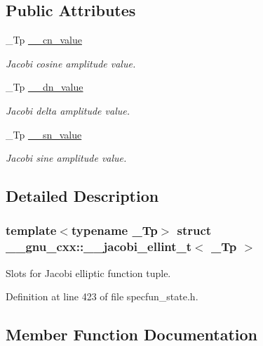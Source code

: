 \subsection*{Public Attributes}
\begin{DoxyCompactItemize}
\item 
\+\_\+\+Tp \hyperlink{struct____gnu__cxx_1_1____jacobi__ellint__t_a2ea9630244e97bfe0e182dbb5682ee30}{\+\_\+\+\_\+cn\+\_\+value}
\begin{DoxyCompactList}\small\item\em Jacobi cosine amplitude value. \end{DoxyCompactList}\item 
\+\_\+\+Tp \hyperlink{struct____gnu__cxx_1_1____jacobi__ellint__t_a08d15b208e574536f8c6113fc7d0c9a9}{\+\_\+\+\_\+dn\+\_\+value}
\begin{DoxyCompactList}\small\item\em Jacobi delta amplitude value. \end{DoxyCompactList}\item 
\+\_\+\+Tp \hyperlink{struct____gnu__cxx_1_1____jacobi__ellint__t_a011eb5bb9a1a6d845a26f17b485cf3d4}{\+\_\+\+\_\+sn\+\_\+value}
\begin{DoxyCompactList}\small\item\em Jacobi sine amplitude value. \end{DoxyCompactList}\end{DoxyCompactItemize}


\subsection{Detailed Description}
\subsubsection*{template$<$typename \+\_\+\+Tp$>$\newline
struct \+\_\+\+\_\+gnu\+\_\+cxx\+::\+\_\+\+\_\+jacobi\+\_\+ellint\+\_\+t$<$ \+\_\+\+Tp $>$}

Slots for Jacobi elliptic function tuple. 

Definition at line 423 of file specfun\+\_\+state.\+h.



\subsection{Member Function Documentation}
\mbox{\label{struct____gnu__cxx_1_1____jacobi__ellint__t_ab9ac21f42a1fc90e86ba76394e413ea7}} 
